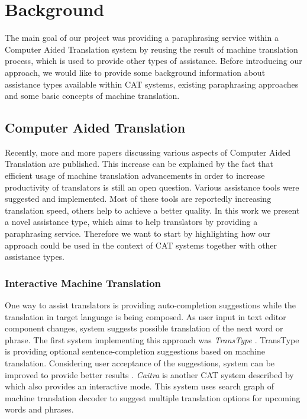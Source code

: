 \chapter{Background}


The main goal of our project was providing a paraphrasing service within a Computer Aided Translation system by reusing the result of machine translation process, which is used to provide other types of assistance. Before introducing our approach, we would like to provide some background information about assistance types available within CAT systems, existing paraphrasing approaches and some basic concepts of machine translation.

\section{Computer Aided Translation}

Recently, more and more papers discussing various aspects of Computer Aided Translation are published. This increase can be explained by the fact that efficient usage of machine translation advancements in order to increase productivity of translators is still an open question. Various assistance tools were suggested and implemented. Most of these tools are reportedly increasing translation speed, others help to achieve a better quality. In this work we present a novel assistance type, which aims to help translators by providing a paraphrasing service. Therefore we want to start by highlighting how our approach could be used in the context of CAT systems together with other assistance types.

\subsection{Interactive Machine Translation}

One way to assist translators is providing auto-completion suggestions while the translation in target language is being composed. As user input in text editor component changes, system suggests possible translation of the next word or phrase. The first system implementing this approach was \emph{TransType} \cite{langlais2000transtype}. TransType is providing optional sentence-completion suggestions based on machine translation. Considering user acceptance of the suggestions, system can be improved to provide better results \cite{barrachina2009statistical}. \emph{Caitra} is another CAT system described by \cite{KoehnHaddow2009} which also provides an interactive mode. This system uses search graph of machine translation decoder to suggest multiple translation options for upcoming words and phrases. 

